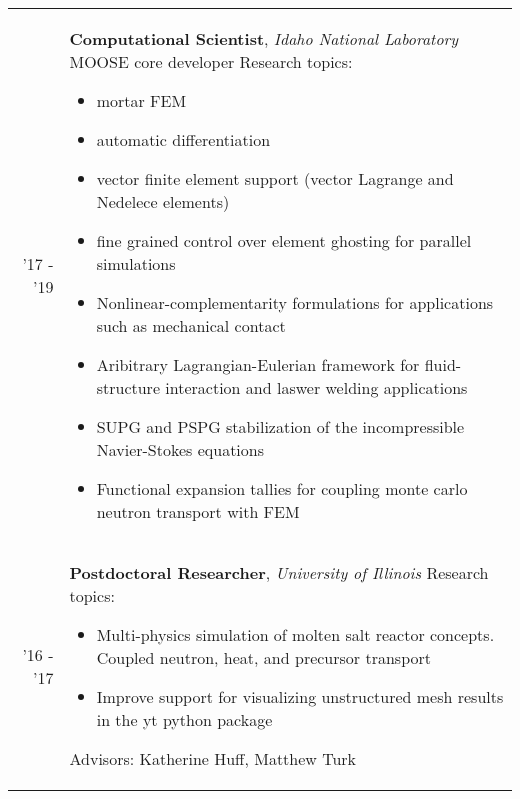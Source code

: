 \documentclass[a4paper,10pt]{article} %
\begin{document}
\begin{table}[H]
  \begin{tabularx}{\textwidth}{r>{\raggedright\arraybackslash}X}

    \textsc{'17 - '19} & \textbf{Computational Scientist}, \textit{Idaho National Laboratory}\newline
    MOOSE core developer\newline
    Research topics:
    \begin{itemize}
    \item mortar FEM
    \item automatic differentiation
    \item vector finite element support (vector Lagrange and Nedelece elements)
    \item fine grained control over element ghosting for parallel simulations
    \item Nonlinear-complementarity formulations for applications such as mechanical contact
    \item Aribitrary Lagrangian-Eulerian framework for fluid-structure interaction and laswer welding applications
    \item SUPG and PSPG stabilization of the incompressible Navier-Stokes equations
    \item Functional expansion tallies for coupling monte carlo neutron transport with FEM
    \end{itemize}\\

    \textsc{'16 - '17} & \textbf{Postdoctoral Researcher}, \textit{University of Illinois} \newline
    Research topics:
    \begin{itemize}
    \item Multi-physics simulation of molten salt reactor concepts. Coupled neutron, heat, and precursor transport
    \item Improve support for visualizing unstructured mesh results in the yt python package
    \end{itemize}
    Advisors: Katherine Huff, Matthew Turk\\

  \end{tabularx}
\end{table}

\end{document}
